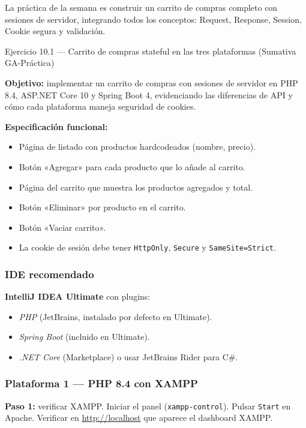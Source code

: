 La práctica de la semana es construir un carrito de compras
completo con sesiones de servidor, integrando todos los conceptos:
Request, Response, Session, Cookie segura y validación.


\begin{cajaejercicio}{Ejercicio 10.1 --- Carrito de compras stateful en las tres plataformas (Sumativa GA-Práctica)}

\textbf{Objetivo:} implementar un carrito de compras con sesiones de
servidor en PHP 8.4, ASP.NET Core 10 y Spring Boot 4, evidenciando las
diferencias de API y cómo cada plataforma maneja seguridad de cookies.

\textbf{Especificación funcional:}
\begin{itemize}
\item Página de listado con productos hardcodeados (nombre, precio).
\item Botón «Agregar» para cada producto que lo añade al carrito.
\item Página del carrito que muestra los productos agregados y total.
\item Botón «Eliminar» por producto en el carrito.
\item Botón «Vaciar carrito».
\item La cookie de sesión debe tener \texttt{HttpOnly},
\texttt{Secure} y \texttt{SameSite=Strict}.
\end{itemize}

\subsubsection*{IDE recomendado}
\textbf{IntelliJ IDEA Ultimate} con plugins:
\begin{itemize}
\item \emph{PHP} (JetBrains, instalado por defecto en Ultimate).
\item \emph{Spring Boot} (incluido en Ultimate).
\item \emph{.NET Core} (Marketplace) o usar JetBrains Rider para C\#.
\end{itemize}

\subsubsection*{Plataforma 1 --- PHP 8.4 con XAMPP}

\textbf{Paso 1:} verificar XAMPP. Iniciar el panel
(\texttt{xampp-control}). Pulsar \texttt{Start} en Apache. Verificar
en \url{http://localhost} que aparece el dashboard XAMPP.


\end{cajaejercicio}
